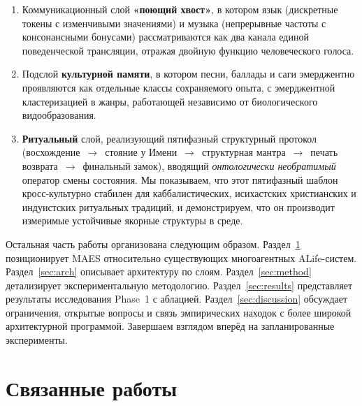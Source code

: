 \documentclass[11pt,a4paper]{article}
\begin{document}
\begin{enumerate}
\item Коммуникационный слой \textbf{«поющий хвост»}, в котором язык
      (дискретные токены с изменчивыми значениями) и музыка (непрерывные
      частоты с консонансными бонусами) рассматриваются как два канала
      единой поведенческой трансляции, отражая двойную функцию
      человеческого голоса.

\item Подслой \textbf{культурной памяти}, в котором песни, баллады и
      саги эмерджентно проявляются как отдельные классы сохраняемого
      опыта, с эмерджентной кластеризацией в жанры, работающей
      независимо от биологического видообразования.

\item \textbf{Ритуальный} слой, реализующий пятифазный структурный
      протокол (восхождение~$\rightarrow$~стояние у Имени~$\rightarrow$~структурная
      мантра~$\rightarrow$~печать возврата~$\rightarrow$~финальный
      замок), вводящий \emph{онтологически необратимый} оператор
      смены состояния. Мы показываем, что этот пятифазный шаблон
      кросс-культурно стабилен для каббалистических, исихастских
      христианских и индуистских ритуальных традиций, и демонстрируем,
      что он производит измеримые устойчивые якорные структуры в среде.
\end{enumerate}

Остальная часть работы организована следующим образом.
Раздел~\ref{sec:related} позиционирует MAES относительно существующих
многоагентных ALife-систем. Раздел~\ref{sec:arch} описывает архитектуру
по слоям. Раздел~\ref{sec:method} детализирует экспериментальную
методологию. Раздел~\ref{sec:results} представляет результаты исследования
Phase~1 с аблацией. Раздел~\ref{sec:discussion} обсуждает ограничения,
открытые вопросы и связь эмпирических находок с более широкой
архитектурной программой. Завершаем взглядом вперёд на запланированные
эксперименты.

\section{Связанные работы}
\label{sec:related}
\end{document}
